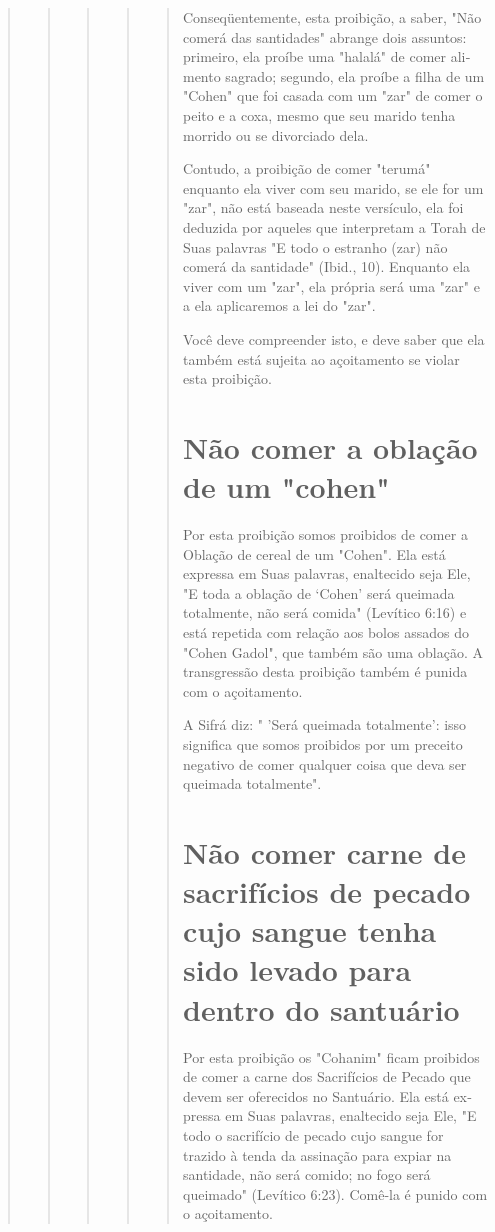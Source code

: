 \begin{quote}
\begin{quote}
\begin{quote}
\begin{quote}
\begin{quote}

Conseqüentemente, esta proibição, a saber, "Não comerá das santi­dades"
abrange dois assuntos: primeiro, ela proíbe uma "halalá" de comer
ali­mento sagrado; segundo, ela proíbe a filha de um "Cohen" que foi
casada com um "zar" de comer o peito e a coxa, mesmo que seu marido
tenha morrido ou se divorciado dela.

Contudo, a proibição de comer "terumá" enquanto ela viver com seu
marido, se ele for um "zar", não está baseada neste versículo, ela foi
dedu­zida por aqueles que interpretam a Torah de Suas palavras "E todo o
estranho (zar) não comerá da santidade" (Ibid., 10). Enquanto ela viver
com um "zar", ela própria será uma "zar" e a ela aplicaremos a lei do
"zar".

Você deve compreender isto, e deve saber que ela também está su­jeita ao
açoitamento se violar esta proibição.

\section{Não comer a oblação de um "cohen"}

Por esta proibição somos proibidos de comer a Oblação de cereal de um
"Cohen". Ela está expressa em Suas palavras, enaltecido seja Ele, "E
to­da a oblação de `Cohen' será queimada totalmente, não será comida"
(Levítico 6:16) e está repetida com relação aos bolos assados do "Cohen
Gadol", que também são uma oblação. A transgressão desta proibição
também é punida com o açoitamento.

A Sifrá diz: " 'Será queimada totalmente': isso significa que somos
proibidos por um preceito negativo de comer qualquer coisa que deva ser
quei­mada totalmente".

\section{Não comer carne de sacrifícios de pecado cujo sangue tenha sido
levado para dentro do santuário}

Por esta proibição os "Cohanim" ficam proibidos de comer a carne dos
Sacrifícios de Pecado que devem ser oferecidos no Santuário. Ela está
ex­pressa em Suas palavras, enaltecido seja Ele, "E todo o sacrifício de
pecado cu­jo sangue for trazido à tenda da assinação para expiar na
santidade, não será comido; no fogo será queimado" (Levítico 6:23).
Comê-la é punido com o açoitamento.


\end{quote}
\end{quote}
\end{quote}
\end{quote}
\end{quote}
